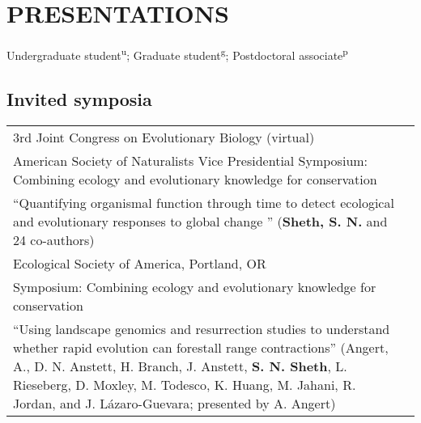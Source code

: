 \documentclass[11pt,english]{article}\usepackage[]{graphicx}\usepackage[]{xcolor}
\providecommand{\tabularnewline}{\\}
\begin{document}
\section*{PRESENTATIONS}
Undergraduate student\textsuperscript{u}; Graduate student\textsuperscript{g}; Postdoctoral associate\textsuperscript{p} 
\vspace{-0.5ex}
\subsection*{Invited symposia}

\begin{tabularx}{\textwidth}{@{}>{\raggedright}p{5.25in}
>{\raggedleft}X@{}}

3rd Joint Congress on Evolutionary Biology (virtual) & 2024 \tabularnewline
\addtolength{\leftskip}{5ex} American Society of Naturalists Vice Presidential Symposium: Combining ecology and evolutionary knowledge for conservation  \tabularnewline
\addtolength{\leftskip}{5ex} ``Quantifying organismal function through time to detect ecological and evolutionary responses to global change '' (\textbf{Sheth, S. N.} and 24 co-authors)
\tabularnewline

Ecological Society of America, Portland, OR & 2023 \tabularnewline
\addtolength{\leftskip}{5ex} Symposium: Combining ecology and evolutionary knowledge for conservation  \tabularnewline
\addtolength{\leftskip}{5ex} ``Using landscape genomics and resurrection studies to understand whether rapid evolution can forestall range contractions'' (Angert, A., D. N. Anstett, H. Branch, J. Anstett, \textbf{S. N. Sheth}, L. Rieseberg, D. Moxley, M. Todesco, K. Huang, M. Jahani, R. Jordan, and J. L\'azaro-Guevara; presented by A. Angert)
\tabularnewline

\end{tabularx}
\end{document}
